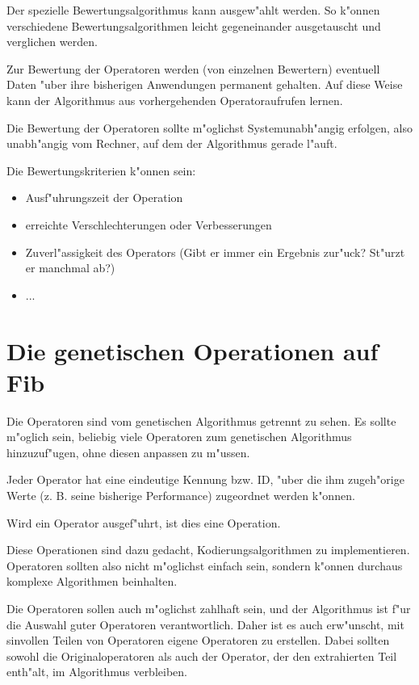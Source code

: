 Der spezielle Bewertungsalgorithmus kann ausgew"ahlt werden. So k"onnen verschiedene Bewertungsalgorithmen leicht gegeneinander ausgetauscht und verglichen werden.

Zur Bewertung der Operatoren werden (von einzelnen Bewertern) eventuell Daten "uber ihre bisherigen Anwendungen permanent gehalten. Auf diese Weise kann der Algorithmus aus vorhergehenden Operatoraufrufen lernen.

Die Bewertung der Operatoren sollte m"oglichst Systemunabh"angig erfolgen, also unabh"angig vom Rechner, auf dem der Algorithmus gerade l"auft.

\bigskip\noindent
Die Bewertungskriterien k"onnen sein:
\begin{itemize}
 \item Ausf"uhrungszeit der Operation
 \item erreichte Verschlechterungen oder Verbesserungen
 \item Zuverl"assigkeit des Operators (Gibt er immer ein Ergebnis zur"uck? St"urzt er manchmal ab?)
 \item ...
\end{itemize}


\section{Die genetischen Operationen auf Fib}

Die Operatoren sind vom genetischen Algorithmus getrennt zu sehen. Es sollte m"oglich sein, beliebig viele Operatoren zum genetischen Algorithmus hinzuzuf"ugen, ohne diesen anpassen zu m"ussen.

Jeder Operator hat eine eindeutige Kennung bzw. ID, "uber die ihm zugeh"orige Werte (z. B. seine bisherige Performance) zugeordnet werden k"onnen.

Wird ein Operator ausgef"uhrt, ist dies eine Operation.

Diese Operationen sind dazu gedacht, Kodierungsalgorithmen zu implementieren. Operatoren sollten also nicht m"oglichst einfach sein, sondern k"onnen durchaus komplexe Algorithmen beinhalten.

Die Operatoren sollen auch m"oglichst zahlhaft sein, und der Algorithmus ist f"ur die Auswahl guter Operatoren verantwortlich. Daher ist es auch erw"unscht, mit sinvollen Teilen von Operatoren eigene Operatoren zu erstellen. Dabei sollten sowohl die Originaloperatoren als auch der Operator, der den extrahierten Teil enth"alt, im Algorithmus verbleiben.

